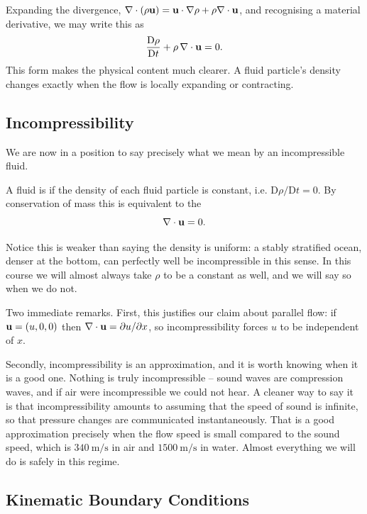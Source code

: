 \documentclass[a4paper]{scrartcl}
\newcommand{\D}{\mathrm{D}}
\newcommand{\Dt}[1]{\frac{\D #1}{\D t}}
\begin{document}
Expanding the divergence, $\nabla \cdot (\rho \mathbf{u}) = \mathbf{u} \cdot \nabla \rho + \rho \nabla \cdot \mathbf{u}$, and recognising a material derivative, we may write this as
$$
\Dt{\rho} + \rho \, \nabla \cdot \vv u = 0.
$$
This form makes the physical content much clearer. A fluid particle's density changes exactly when the flow is locally expanding or contracting.

\subsection{Incompressibility}

We are now in a position to say precisely what we mean by an incompressible fluid.

\begin{definition}
	A fluid is  if the density of each fluid particle is constant, i.e. $\D\rho/\D t = 0$. By conservation of mass this is equivalent to the 
	$$
	\nabla \cdot \mathbf{u} = 0.
	$$
\end{definition}

Notice this is weaker than saying the density is uniform: a stably stratified ocean, denser at the bottom, can perfectly well be incompressible in this sense. In this course we will almost always take $\rho$ to be a constant as well, and we will say so when we do not.

Two immediate remarks. First, this justifies our claim about parallel flow: if $\mathbf{u} = (u, 0, 0)$ then $\nabla \cdot \mathbf{u} = \partial u/\partial x$, so incompressibility forces $u$ to be independent of $x$.

Secondly, incompressibility is an approximation, and it is worth knowing when it is a good one. Nothing is truly incompressible -- sound waves are compression waves, and if air were incompressible we could not hear. A cleaner way to say it is that incompressibility amounts to assuming that the speed of sound is infinite, so that pressure changes are communicated instantaneously. That is a good approximation precisely when the flow speed is small compared to the sound speed, which is $\SI{340}{\meter\per\second}$ in air and $\SI{1500}{\meter\per\second}$ in water. Almost everything we will do is safely in this regime.

\subsection{Kinematic Boundary Conditions}
\end{document}
